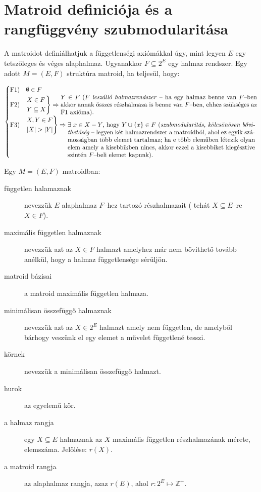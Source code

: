 \section{Matroid definiciója és a rangfüggvény szubmodularitása}

A matroidot definiálhatjuk a függetlenségi axiómákkal úgy, mint legyen $E$ egy
tetszőleges és véges alaphalmaz. Ugyanakkor $F \subseteq  2^E$ egy halmaz
rendszer. Egy adott $M=(E,F)$ struktúra matroid, ha teljesül, hogy:

\[
	\begin{cases}
	\mbox{F1}) &\emptyset \in F \\
	\mbox{F2}) &\begin{rcases}
		X \in F \\
		Y \subseteq X
	\end{rcases} \Rightarrow \parbox[L]{11cm}{$Y \in F$ %
	($F$ \emph{leszálló halmazrendszer} -- ha egy halmaz benne van $F$--ben akkor annak összes
	részhalmaza is benne van $F$--ben, ehhez szükséges az F$1$ axióma).
	} \\
	\mbox{F3}) &\begin{rcases}
		X,Y \in F \\
		|X| > |Y| \\
	\end{rcases} \Rightarrow\parbox[t]{10.5cm}{ $\exists~x \in X-Y$,~hogy $Y \cup \{x\} %
\in F~($\emph{szubmodularitás, kölcsönösen bővithetőség} -- legyen két halmazrendszer %
	a matroidból, ahol ez egyik számosságban több elemet tartalmaz; ha e több
	eleműben létezik olyan elem amely a kisebbikben nincs, akkor ezzel a kisebbiket
	kiegésztive szintén $F$--beli elemet kapunk).}
	\end{cases}
\]

Egy $M=(E,F)$ matroidban:

\begin{description}
	\item[független halamaznak] nevezzük $E$ alaphalmaz $F$--hez tartozó
	      részhalmazait ( tehát $X\subseteq E$--re $X \in F$).
	\item[maximális független halmaznak] nevezzük azt az $X \in F$ halmazt
	      amelyhez már nem bővithető tovább anélkül, hogy a halmaz függetlensége
	      sérüljön.
	\item[matroid bázisai] a matroid maximális független halmaza.
	\item[minimálisan összefüggő halmaznak] nevezzük azt az $X \in 2^E$ halmazt
	      amely nem független, de amelyből bárhogy veszünk el egy elemet a művelet
	      függetlené tesszi.
	\item[körnek] nevezzük a minimálisan összefüggő halmazt.
	\item[hurok] az egyelemű kör.
	\item[a halmaz rangja] egy $X\subseteq E$ halmaznak az $X$ maximális
	      független részhalmazának mérete, elemszáma. Jelölése: $r(X)$.
	\item[a matroid rangja] az alaphalmaz rangja, azaz $r(E)$, ahol $r:2^E \mapsto \mathbb{Z}^+$.
\end{description}

